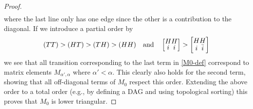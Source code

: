 \documentclass[10pt,a4paper]{amsart}
\begin{document}
\begin{proof}
\begin{align}
\end{align}
where the last line only has one edge since the other is a contribution to the diagonal. If we introduce a partial order by 
\[
\renewcommand{\arraystretch}{0.7}
(TT) > (HT) > (TH) > (HH)
\quad\text{and}\quad
\left[
\begin{array}{@{}c@{}c@{}c@{}c@{}}
H & H\\
i & i
\end{array}\right]
>
\left[
\begin{array}{@{}c@{}c@{}c@{}c@{}}
H & H\\
i & \bar i
\end{array}
\right]
\]
we see that 
all transition corresponding to the last term in \eqref{M0-def} correspond to matrix elements $M_{\alpha',\alpha}$ where $\alpha'<\alpha$.  This clearly also holds for the second term, showing that all off-diagonal terms of $M_0$ respect this order.  Extending the above order to a total order (e.g., by defining a DAG and using topological sorting) this proves that $M_0$ is lower triangular.
\end{proof}
\end{document}
